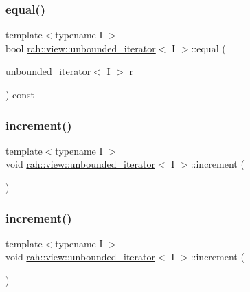 \subsubsection{\texorpdfstring{equal()}{equal()}\hspace{0.1cm}{\footnotesize\ttfamily [2/2]}}
{\footnotesize\ttfamily template$<$typename I $>$ \\
bool \mbox{\hyperlink{structrah_1_1view_1_1unbounded__iterator}{rah\+::view\+::unbounded\+\_\+iterator}}$<$ I $>$\+::equal (\begin{DoxyParamCaption}\item[{\mbox{\hyperlink{structrah_1_1view_1_1unbounded__iterator}{unbounded\+\_\+iterator}}$<$ I $>$}]{r }\end{DoxyParamCaption}) const\hspace{0.3cm}{\ttfamily [inline]}}

\mbox{\label{structrah_1_1view_1_1unbounded__iterator_a903c96112b62831505ba8c7af80f6263}} 
\subsubsection{\texorpdfstring{increment()}{increment()}\hspace{0.1cm}{\footnotesize\ttfamily [1/2]}}
{\footnotesize\ttfamily template$<$typename I $>$ \\
void \mbox{\hyperlink{structrah_1_1view_1_1unbounded__iterator}{rah\+::view\+::unbounded\+\_\+iterator}}$<$ I $>$\+::increment (\begin{DoxyParamCaption}{ }\end{DoxyParamCaption})\hspace{0.3cm}{\ttfamily [inline]}}

\mbox{\label{structrah_1_1view_1_1unbounded__iterator_a903c96112b62831505ba8c7af80f6263}} 
\subsubsection{\texorpdfstring{increment()}{increment()}\hspace{0.1cm}{\footnotesize\ttfamily [2/2]}}
{\footnotesize\ttfamily template$<$typename I $>$ \\
void \mbox{\hyperlink{structrah_1_1view_1_1unbounded__iterator}{rah\+::view\+::unbounded\+\_\+iterator}}$<$ I $>$\+::increment (\begin{DoxyParamCaption}{ }\end{DoxyParamCaption})\hspace{0.3cm}{\ttfamily [inline]}}



